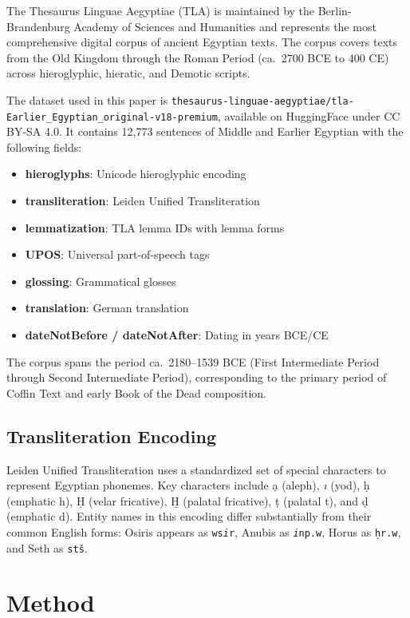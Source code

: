 \documentclass[11pt]{article}
\begin{document}
The Thesaurus Linguae Aegyptiae (TLA) \cite{tla} is maintained by the Berlin-Brandenburg Academy of Sciences and Humanities and represents the most comprehensive digital corpus of ancient Egyptian texts. The corpus covers texts from the Old Kingdom through the Roman Period (ca.\ 2700 BCE to 400 CE) across hieroglyphic, hieratic, and Demotic scripts.

The dataset used in this paper is \texttt{thesaurus-linguae-aegyptiae/tla-Earlier\_Egyptian\_original-v18-premium}, available on HuggingFace under CC BY-SA 4.0. It contains 12,773 sentences of Middle and Earlier Egyptian with the following fields:

\begin{itemize}
    \item \textbf{hieroglyphs}: Unicode hieroglyphic encoding
    \item \textbf{transliteration}: Leiden Unified Transliteration
    \item \textbf{lemmatization}: TLA lemma IDs with lemma forms
    \item \textbf{UPOS}: Universal part-of-speech tags
    \item \textbf{glossing}: Grammatical glosses
    \item \textbf{translation}: German translation
    \item \textbf{dateNotBefore / dateNotAfter}: Dating in years BCE/CE
\end{itemize}

The corpus spans the period ca.\ 2180--1539 BCE (First Intermediate Period through Second Intermediate Period), corresponding to the primary period of Coffin Text and early Book of the Dead composition.

\subsection{Transliteration Encoding}

Leiden Unified Transliteration uses a standardized set of special characters to represent Egyptian phonemes. Key characters include \d{a} (aleph), \textit{\i} (yod), \d{h} (emphatic h), \d{H} (velar fricative), \b{H} (palatal fricative), \d{t} (palatal t), and \d{d} (emphatic d). Entity names in this encoding differ substantially from their common English forms: Osiris appears as \texttt{ws\textit{i}r}, Anubis as \texttt{\textit{i}np.w}, Horus as \texttt{\d{h}r.w}, and Seth as \texttt{st\v{s}}.

\section{Method}
\end{document}
